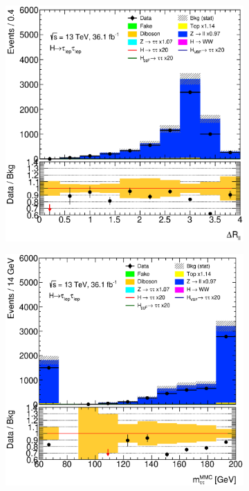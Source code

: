 \begin{figure}[htb]
    \centering
    \begin{subfigure}[t]{0.3\textwidth}
        \includegraphics[width=\textwidth]{./plots/mva/modeling/input_vars/VBF_CR/ll-CutMVAVBFCatZllCR-DeltaRLL-lin.eps}
    \end{subfigure}
    \begin{subfigure}[t]{0.3\textwidth}
        \includegraphics[width=\textwidth]{./plots/mva/modeling/input_vars/VBF_CR/ll-CutMVAVBFCatZllCR-dilep_mmc_mlm_m_ub-lin.eps}

\end{subfigure}
\end{figure}
